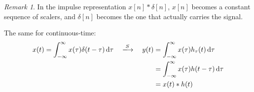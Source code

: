 \documentclass[10pt,UTF8]{article}
\newenvironment{definition box}
{\begin{tcolorbox}[colback=blue!5!white,colframe=blue!75!black,parbox=false,before upper=\par,before lower=\par]}
{\end{tcolorbox}}
\newenvironment{theorem box}
{\begin{tcolorbox}[colback=yellow!5!white,colframe=yellow!75!black,parbox=false,before upper=\par,before lower=\par]}
{\end{tcolorbox}}
\theoremstyle{definition}
\newtheorem{definition inner}{Definition}[section]
\theoremstyle{plain}
\newtheorem{theorem inner}{Theorem}[section]
\theoremstyle{definition}
\newtheorem*{proof inner}{\textit{Proof}}
\theoremstyle{remark}
\newtheorem*{remark}{\textit{Remark}}
\begin{document}
\begin{remark}
    In the impulse representation $x[n] \ast \delta[n]$,
    $x[n]$ becomes a constant sequence of scalers,
    and $\delta[n]$ becomes the one that actually carries the signal.
\end{remark}

The same for continuous-time:
\begin{align*}
    x(t) = \int_{-\infty}^{\infty} x(\tau) \delta(t-\tau) \dd{\tau}
    \quad\xlongrightarrow{S}\quad y(t) &=
    \int_{-\infty}^{\infty} x(\tau) h_\tau(t) \dd{\tau} \\
    &= \int_{-\infty}^{\infty} x(\tau) h(t-\tau) \dd{\tau} \\
    &= x(t) \ast h(t)
\end{align*}
\end{document}
